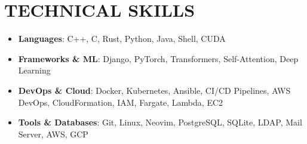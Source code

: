 \documentclass[a4paper,10pt]{article}
\begin{document}



\section*{TECHNICAL SKILLS}
\begin{itemize}
  \item \textbf{Languages}: C++, C, Rust, Python, Java, Shell, CUDA
  \item \textbf{Frameworks \& ML}: Django, PyTorch, Transformers, Self-Attention, Deep Learning
  \item \textbf{DevOps \& Cloud}: Docker, Kubernetes, Ansible, CI/CD Pipelines, AWS DevOps, CloudFormation, IAM, Fargate, Lambda, EC2
  \item \textbf{Tools \& Databases}: Git, Linux, Neovim, PostgreSQL, SQLite, LDAP, Mail Server, AWS, GCP
\end{itemize}

\end{document}
